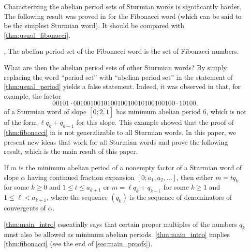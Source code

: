 \documentclass[a4paper,fleqn]{article}
\begin{document}
  Characterizing the abelian period sets of Sturmian words is significantly harder. The following result was proved in
  \cite{2016:abelian_powers_and_repetitions_in_sturmian_words} for the Fibonacci word (which can be said to be the
  simplest Sturmian word). It should be compared with \autoref{thm:usual_fibonacci}.

  \begin{theorem}\label{thm:fibonacci}\cite[Thm.~6.9]{2016:abelian_powers_and_repetitions_in_sturmian_words},\cite[Thm.~6.12]{2016:abelian_powers_and_repetitions_in_sturmian_words}
    The abelian period set of the Fibonacci word is the set of Fibonacci numbers.
  \end{theorem}

  What are then the abelian period sets of other Sturmian words? By simply replacing the word ``period set'' with
  ``abelian period set'' in the statement of \autoref{thm:usual_period} yields a false statement. Indeed, it was
  observed in \cite[Remark~6.11]{2016:abelian_powers_and_repetitions_in_sturmian_words} that, for example, the factor
  \begin{equation*}
    00101 \cdot 001001001010010010010100100100 \cdot 10100,
  \end{equation*}
  of a Sturmian word of slope $[0;\overline{2,1}]$ has minimum abelian period $6$, which is not of the form
  $\ell q_k + q_{k-1}$ for this slope. This example showed that the proof of \autoref{thm:fibonacci} in
  \cite{2016:abelian_powers_and_repetitions_in_sturmian_words} is not generalizable to all Sturmian words. In this
  paper, we present new ideas that work for all Sturmian words and prove the following result, which is the main result
  of this paper.

  \begin{theorem}\label{thm:main_intro}
    If $m$ is the minimum abelian period of a nonempty factor of a Sturmian word of slope $\alpha$ having continued
    fraction expansion $[0; a_1, a_2, \ldots]$, then either $m = tq_k$ for some $k \geq 0$ and
    $1 \leq t \leq a_{k+1}$ or $m = \ell q_k + q_{k-1}$ for some $k \geq 1$ and $1 \leq \ell < a_{k+1}$, where the
    sequence $(q_k)$ is the sequence of denominators of convergents of $\alpha$.
  \end{theorem}

  \autoref{thm:main_intro} essentially says that certain proper multiples of the numbers $q_k$ must also be allowed as
  minimum abelian periods. \autoref{thm:main_intro} implies \autoref{thm:fibonacci} (see the end of
  \autoref{sec:main_proofs}).
\end{document}
